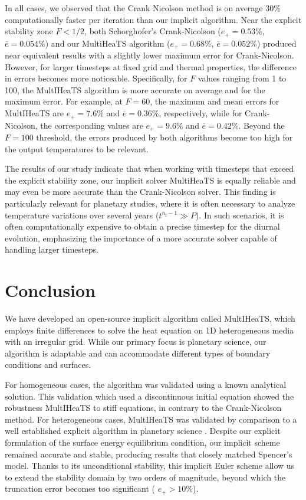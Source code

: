 \documentclass[sn-vancouver, Numbered]{sn-jnl}
\begin{document}
In all cases, we observed that the Crank Nicolson method is on average 30\% computationally faster per iteration than our implicit algorithm.
Near the explicit stability zone $F < 1/2$, both Schorghofer's Crank-Nicolson ($e_+=0.53\%$, $\overline{e} = 0.054\%$) and our MultiHeaTS algorithm ($e_+=0.68\%$, $\overline{e} = 0.052\%$) produced near equivalent results with a slightly lower maximum error for Crank-Nicolson. 
However, for larger timesteps at fixed grid and thermal properties, the difference in errors becomes more noticeable. 
Specifically, for $F$ values ranging from 1 to 100, the MultIHeaTS algorithm is more accurate on average and for the maximum error. For example, at $F = 60$, the maximum and mean errors for MultIHeaTS are $e_+ = 7.6 \%$ and $\overline{e} = 0.36\%$, respectively, while for Crank-Nicolson, the corresponding values are $e_+ = 9.6 \%$ and $\overline{e} = 0.42\%$. 
Beyond the $F=100$ threshold, the errors produced by both algorithms become too high for the output temperatures to be relevant.


 The results of our study indicate that when working with timesteps that exceed the explicit stability zone, our implicit solver MultiHeaTS is equally reliable and may even be more accurate than the Crank-Nicolson solver. This finding is particularly relevant for planetary studies, where it is often necessary to analyze temperature variations over several years ($t^{n_t-1} \gg P$).
 In such scenarios, it is often computationally expensive to obtain a precise timestep for the diurnal evolution, emphasizing the importance of a more accurate solver capable of handling larger timesteps.
 

 



\section{Conclusion}
We have developed an open-source implicit algorithm called MultIHeaTS, which employs finite differences to solve the heat equation on 1D heterogeneous media with an irregular grid. While our primary focus is planetary science, our algorithm is adaptable and can accommodate different types of boundary conditions and surfaces.

For homogeneous cases, the algorithm was validated using a known analytical solution.
This validation which used a discontinuous initial equation showed the robustness MultIHeaTS to stiff equations, in contrary to the Crank-Nicolson method.
For heterogeneous cases, MultIHeaTS was validated by comparison to a well established explicit algorithm in planetary science \cite{Spencer1989}.
Despite our explicit formulation of the surface energy equilibrium condition, our implicit scheme remained accurate and stable, producing results that closely matched Spencer's model.
Thanks to its unconditional stability, this implicit Euler scheme allow us to extend the stability domain by two orders of magnitude, beyond which the truncation error becomes too significant ( $ e_+ > 10 \%$).
\end{document}
